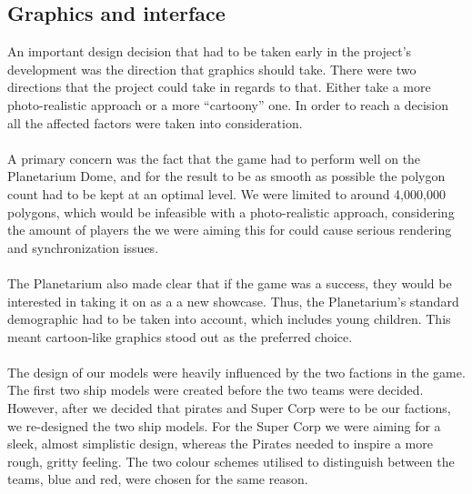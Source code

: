 \documentclass[11pt,a4paper]{article}
\begin{document}
       \subsection{Graphics and interface}

       \noindent
        An important design decision that had to be taken early in the project's development was the direction that graphics should take. There were two directions that the project could take in regards to that. Either take a more photo-realistic approach or a more “cartoony” one. In order to reach a decision all the affected factors were taken into consideration. \\ \\A primary concern was the fact that the game had to perform well on the Planetarium Dome, and for the result to be as smooth as possible the polygon count had to be kept at an optimal level. We were limited to around 4,000,000 polygons, which would be infeasible with a photo-realistic approach, considering the amount of players the we were aiming this for could cause serious rendering and synchronization issues. \\ \\
        \noindent
        The Planetarium also made clear that if the game was a success, they would be interested in taking it on as a a new showcase. Thus, the Planetarium’s standard demographic had to be taken into account, which includes young children. This meant cartoon-like graphics stood out as the preferred choice.  \\ \\
\noindent
        The design of our models were heavily influenced by the two factions in the game. The first two ship models were created before the two teams were decided. However, after we decided that pirates and Super Corp were to be our factions, we re-designed the two ship models. For the Super Corp we were aiming for a sleek, almost simplistic design, whereas the Pirates needed to inspire a more rough, gritty feeling. The two colour schemes utilised to distinguish between the teams, blue and red, were chosen for the same reason. \\ \\
\end{document}
